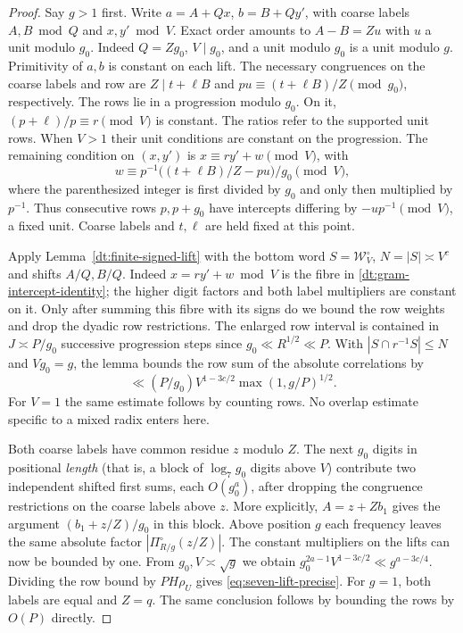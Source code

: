 \documentclass[11pt,a4paper]{article}
\theoremstyle{paperplain}
\numberwithin{equation}{section}
\begin{document}
\begin{proof}
Say $g>1$ first. Write $a=A+Qx$, $b=B+Qy'$, with coarse labels
$A,B\bmod Q$ and $x,y'\bmod V$. Exact order amounts to $A-B=Zu$
with $u$ a unit modulo $g_0$. Indeed $Q=Zg_0$, $V\mid g_0$,
and a unit modulo $g_0$ is a unit modulo $g$. Primitivity of $a,b$
is constant on each lift. The necessary congruences on the coarse
labels and row are $Z\mid t+\ell B$ and
$p u\equiv(t+\ell B)/Z\pmod{g_0}$, respectively. The rows lie in
a progression modulo $g_0$. On it, $(p+\ell)/p\equiv r\pmod V$
is constant. The ratios refer to the supported unit rows. When
$V>1$ their unit conditions are constant on the progression.
The remaining condition on $(x,y')$ is
$x\equiv r y'+w\pmod V$, with
\[
 w\equiv p^{-1}\big((t+\ell B)/Z-pu\big)/g_0\pmod V ,
\]
where the parenthesized integer is first divided by $g_0$ and only then
multiplied by $p^{-1}$. Thus consecutive rows $p,p+g_0$ have intercepts
differing by $-up^{-1}\pmod V$, a fixed unit. Coarse labels and $t,\ell$
are held fixed at this point.

Apply Lemma~\ref{dt:finite-signed-lift} with the bottom word
$S=\mathcal W_V^\circ$, $N=|S|\asymp V^c$ and shifts $A/Q,B/Q$.
Indeed $x=ry'+w\bmod V$ is the fibre in \eqref{dt:gram-intercept-identity};
the higher digit factors and both label multipliers are constant on it.
Only after summing this fibre with its signs do we bound the row weights
and drop the dyadic row restrictions. The enlarged row interval is
contained in $J\asymp P/g_0$ successive progression steps since
$g_0\ll R^{1/2}\ll P$. With $|S\cap r^{-1}S|\le N$ and $Vg_0=g$,
the lemma bounds the row sum of the absolute correlations by
\[
 \ll (P/g_0)V^{1-3c/2}\max(1,g/P)^{1/2}.
\]
For $V=1$ the same estimate follows by counting rows. No overlap
estimate specific to a mixed radix enters here.

Both coarse labels have common residue $z$ modulo $Z$. The next
$g_0$ digits in positional \emph{length} (that is, a block of
$\log_7g_0$ digits above $V$) contribute two independent shifted
first sums, each $O(g_0^a)$, after dropping the congruence restrictions
on the coarse labels above $z$. More explicitly, $A=z+Zb_1$
gives the argument $(b_1+z/Z)/g_0$ in this block. Above position $g$
each frequency leaves the same absolute factor
$|\Pi_{R/g}^\circ(z/Z)|$. The constant multipliers on the lifts
can now be bounded by one. From $g_0,V\asymp\sqrt g$ we obtain
$g_0^{2a-1}V^{1-3c/2}\ll g^{a-3c/4}$. Dividing the row bound by
$PH\rho_U$ gives \eqref{eq:seven-lift-precise}.
For $g=1$, both labels are equal and $Z=q$. The same conclusion
follows by bounding the rows by $O(P)$ directly.


\end{proof}
\end{document}
